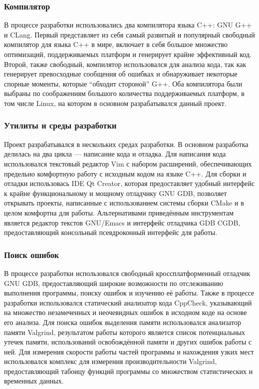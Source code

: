 \documentclass[a4paper,12pt]{report}
\begin{document}
\subsubsection{Компилятор}
В процессе разработки использовались два компилятора языка C++: GNU G++ и CLang. Первый представляет из себя самый развитый и популярный свободный компилятор для языка C++ в мире, включает в себя большое множество оптимизаций, поддерживаемых платформ и генерирует крайне эффективный код. Второй, также свободный, компилятор использовался для анализа кода, так как генерирует превосходные сообщения об ошибках и обнаруживает некоторые спорные моменты, которые ``обходит стороной'' G++. Оба компилятора были выбраны по соображениям большого количества поддерживаемых платформ, в том числе Linux, на котором в основном разрабатывался данный проект.

\subsubsection{Утилиты и среды разработки}
Проект разрабатывался в нескольких средах разработки. В основном разработка делилась на два цикла --- написание кода и отладка. Для написания кода использовался текстовый редактор Vim с набором расширений, обеспечивающих предельно комфортную работу с исходным кодом на языке C++. Для сборки и отладки использовась IDE Qt Creator, которая предоставляет удобный интерфейс к крайне функциональному и мощному отладчику GNU GDB, позволяет открывать проекты, написанные с использованием системы сборки CMake и в целом комфортна для работы. Альтернативами приведённым инструментам является редактор текстов GNU/Emacs и интерфейс отладчика GDB CGDB, предоставляющий консольный псевдроконный интерфейс для работы.

\subsubsection{Поиск ошибок}
В процессе разработки использовался свободный кроссплатформенный отладчик GNU GDB, предоставляющий широкие возможности по отслеживанию выполнения программы, поиску ошибок и изучению её работы. Также в процессе разработки использовался статический анализатор кода CppCheck, указывающий на множество незамеченных и неочевидных ошибок в исходном коде на основе его анализа. Для поиска ошибок выделения памяти использовался анализатор памяти Valgrind, результатом работы которого является список потенциальных утечек памяти, использований освобождённой памяти и других ошибок работы с ней. Для измерения скорости работы частей программы и нахождения узких мест использовался комплекс для измерения производительности Valgrind, предоставляющий табоицу функций программы со множеством статистических и временных данных.
\end{document}
